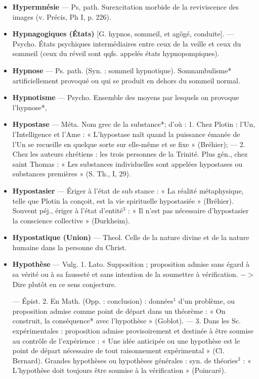 \begin{itemize}[leftmargin=1cm, label=, itemsep=1pt]
\item {\bf Hypermnésie} — Ps, path. Surexcitation morbide de la reviviscence
des images (v. Précis, Ph I,
p. 226).

\item {\bf Hypnagogiques (États)} [G. hypnos,
sommeil, et agôgé, conduite]. —
Psycho. États psychiques intermédiaires entre ceux de la veille et
ceux du sommeil (ceux du réveil
sont qqfs. appelés états hypnopompiques).

\item {\bf Hypnose} — Ps. path. (Syn. : sommeil
hypnotique). Somnambulisme* artificiellement provoqué ou qui se produit en dehors du sommeil normal.

\item {\bf Hypnotisme} — Psycho. Ensemble
des moyens par lesquels on provoque l’hypnose*,

\item {\bf Hypostase} — Méta. Nom grec de la
substance*; d’où : 1. Chez Plotin :
l'Un, l'Intelligence et l'Ame : « L'hypostase naît quand la puissance
émanée de l'Un se recueille en
quelque sorte sur elle-même et se
fixe » (Bréhier); — 2. Chez les auteurs chrétiens : les trois personnes
de la Trinité. Plus gén., chez saint
Thomas : « Les substances individuelles sont appelées hypostases
ou substances premières » (S. Th.,
I, 29).

\item {\bf Hypostasier} — Ériger à l'état de sub
stance : « La réalité métaphysique,
telle que Plotin la conçoit, est la
vie spirituelle hypostasiée » (Bréhier).
Souvent péj., ériger à l’état d’entité$^3$ :
« Il n’est pas nécessaire d’hypostasier la conscience collective » (Durkheim).

\item {\bf Hypostatique (Union)} — Theol. Celle
de la nature divine et de la nature
humaine dans la personne du Christ.

\item {\bf Hypothèse} — Vulg. 1. Lato. Supposition ; proposition admise sans
égard à sa vérité ou à sa fausseté et
sans intention de la soumettre à
vérification. $->$ Dire plutôt en ce
sens conjecture.

— Épist. 2. En Math. (Opp. : conclusion) : données$^1$ d’un problème,
ou proposition admise comme point
de départ dans un théorème : « On
construit, la conséquence* avec
l'hypothèse » (Goblot). — 3. Dans
les Sc. expérimentales : proposition
admise provisoirement et destinée
à être soumise au contrôle de l’expérience : « Une idée anticipée ou une
hypothèse est le point de départ
nécessaire de tout raisonnement
expérimental » (Cl. Bernard). Grandes hypothèses ou hypothèses générales : syn. de théories$^3$ : « L’hypothèse doit toujours être soumise à la
vérification » (Poincaré).


\end{itemize}
